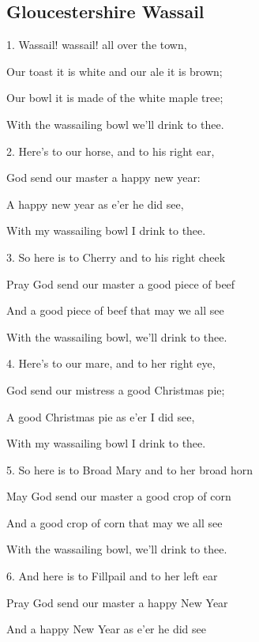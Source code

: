 \subsection{Gloucestershire Wassail}\label{wassail}
\begin{description}[nosep,leftmargin=\parindent,labelsep=0pt]
\item 1. Wassail! wassail! all over the town, 
\item Our toast it is white and our ale it is brown; 
\item Our bowl it is made of the white maple tree; 
\item With the wassailing bowl  we'll drink to thee. 
\vspace{1.5ex}
\item 2. Here's to our horse, and to his right ear, 
\item God send our master a happy new year: 
\item A happy new year as e'er he did see, 
\item With my wassailing bowl I drink to thee. 
\vspace{1.5ex}
\item 3. So here is to Cherry and to his right cheek 
\item Pray God send our master a good piece of beef 
\item And a good piece of beef that may we all see 
\item With the wassailing bowl, we'll drink to thee. 
\vspace{1.5ex}
\item 4. Here's to our mare, and to her right eye, 
\item God send our mistress a good Christmas pie; 
\item A good Christmas pie as e'er I did see, 
\item With my wassailing bowl I drink to thee. 
\vspace{1.5ex}
\item 5. So here is to Broad Mary and to her broad horn 
\item May God send our master a good crop of corn 
\item And a good crop of corn that may we all see 
\item With the wassailing bowl, we'll drink to thee. 
\vspace{1.5ex}
\item 6. And here is to Fillpail and to her left ear 
\item Pray God send our master a happy New Year 
\item And a happy New Year as e'er he did see 

\end{description}
